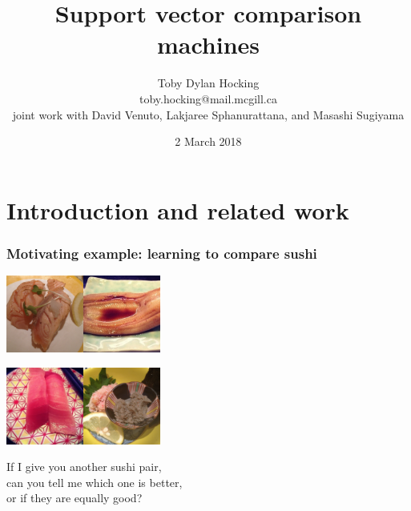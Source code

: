 \documentclass{beamer}
\begin{document}
\title{Support vector comparison machines}
\author{
Toby Dylan Hocking\\
toby.hocking@mail.mcgill.ca\\
joint work with David Venuto,  Lakjaree Sphanurattana, and Masashi Sugiyama
}

\date{2 March 2018}

\maketitle

\section{Introduction and related work}

\begin{frame}
  \frametitle{Motivating example: learning to compare sushi}
  \includegraphics[width=1in]{sushi_salmon}\includegraphics[width=1in]{sushi_anago}

  \includegraphics[width=1in]{sushi_chu-toro}\includegraphics[width=1in]{sushi_kani-miso}

If I give you another sushi pair,\\
can you tell me which one is better,\\
\alert<2>{or if they are equally good?}
\end{frame}
\end{document}
